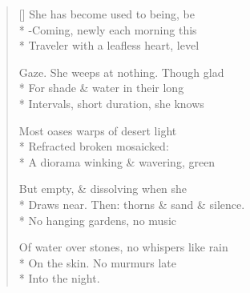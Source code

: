 \label{ch:out_of_the_night}
\settowidth{\versewidth}{Draws near.  Then: thorns \& sand \& silence.}
\begin{verse}[\versewidth]
She has become used to being, be\\*
-Coming, newly each morning this\\*
Traveler with a leafless heart, level

Gaze.  She weeps at nothing.  Though glad\\*
For shade \& water in their long\\*
Intervals, short duration, she knows

Most oases warps of desert light\\*
Refracted  broken  mosaicked:\\*
A diorama winking \& wavering, green

But empty, \& dissolving when she\\*
Draws near.  Then: thorns \& sand \& silence.\\*
No hanging gardens, no music

Of water over stones, no whispers like rain\\*
On the skin. No murmurs late\\*
Into the night.
\end{verse}
